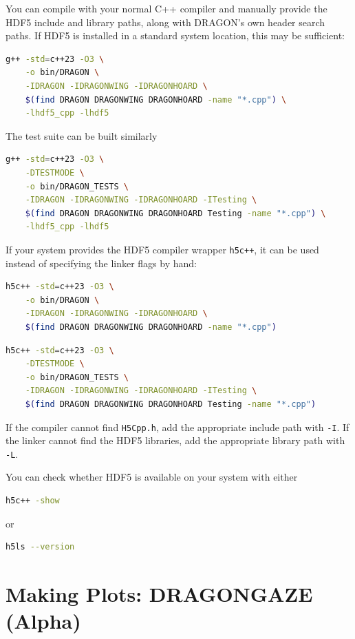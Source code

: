 \documentclass[11pt]{report}
\newcommand{\bash}[1]{\lstinline[language=bash]{#1}}
\begin{document}
You can compile with your normal C++ compiler and manually provide the HDF5 include and library paths, along with DRAGON's own header search paths. If HDF5 is installed in a standard system location, this may be sufficient:
\begin{lstlisting}[language=bash]
g++ -std=c++23 -O3 \
    -o bin/DRAGON \
    -IDRAGON -IDRAGONWING -IDRAGONHOARD \
    $(find DRAGON DRAGONWING DRAGONHOARD -name "*.cpp") \
    -lhdf5_cpp -lhdf5
\end{lstlisting}

The test suite can be built similarly
\begin{lstlisting}[language=bash]
g++ -std=c++23 -O3 \
    -DTESTMODE \
    -o bin/DRAGON_TESTS \
    -IDRAGON -IDRAGONWING -IDRAGONHOARD -ITesting \
    $(find DRAGON DRAGONWING DRAGONHOARD Testing -name "*.cpp") \
    -lhdf5_cpp -lhdf5
\end{lstlisting}

If your system provides the HDF5 compiler wrapper \bash{h5c++}, it can be used instead of specifying the linker flags by hand:
\begin{lstlisting}[language=bash]
h5c++ -std=c++23 -O3 \
    -o bin/DRAGON \
    -IDRAGON -IDRAGONWING -IDRAGONHOARD \
    $(find DRAGON DRAGONWING DRAGONHOARD -name "*.cpp")
\end{lstlisting}
\begin{lstlisting}[language=bash]
h5c++ -std=c++23 -O3 \
    -DTESTMODE \
    -o bin/DRAGON_TESTS \
    -IDRAGON -IDRAGONWING -IDRAGONHOARD -ITesting \
    $(find DRAGON DRAGONWING DRAGONHOARD Testing -name "*.cpp")
\end{lstlisting}

If the compiler cannot find \bash{H5Cpp.h}, add the appropriate include path with \bash{-I}. If the linker cannot find the HDF5 libraries, add the appropriate library path with \bash{-L}. 

You can check whether HDF5 is available on your system with either
\begin{lstlisting}[language=bash]
h5c++ -show
\end{lstlisting}
or
\begin{lstlisting}[language=bash]
h5ls --version
\end{lstlisting}


\chapter{Making Plots: DRAGONGAZE (Alpha)}
\label{ch:gaze}
\end{document}
